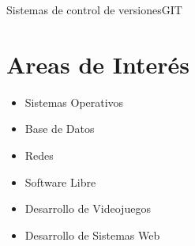 \documentclass[10pt,a4paper]{moderncv}
\begin{document}
				{Sistemas de control de versiones}{GIT}	


\section{Areas de Inter\'es}
	\begin{itemize}
		\item{Sistemas Operativos} 
		\item{Base de Datos} 
		\item{Redes}
		\item{Software Libre} 
        \item{Desarrollo de Videojuegos}
        \item{Desarrollo de Sistemas Web}
	\end{itemize}
\end{document}
